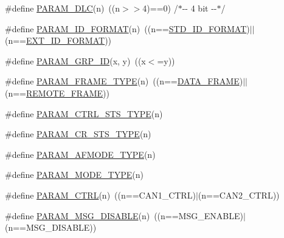 \begin{DoxyCompactItemize}
\item 
\#define \hyperlink{group___c_a_n___private___macros_ga361ef9af0ad2505b634d74179f63a685}{\-P\-A\-R\-A\-M\-\_\-\-D\-L\-C}(n)~((n$>$$>$4)==0)  /$\ast$-\/-\/ 4 bit -\/-\/$\ast$/
\item 
\#define \hyperlink{group___c_a_n___private___macros_ga61c9024337e9b7ef5df84b47d4118b0b}{\-P\-A\-R\-A\-M\-\_\-\-I\-D\-\_\-\-F\-O\-R\-M\-A\-T}(n)~((n==\hyperlink{group___c_a_n___public___types_ggab5c597672ab7b26c153bcaeda4828e37afa259432f5255caea8a3fabc42c61efe}{\-S\-T\-D\-\_\-\-I\-D\-\_\-\-F\-O\-R\-M\-A\-T})$|$$|$(n==\hyperlink{group___c_a_n___public___types_ggab5c597672ab7b26c153bcaeda4828e37a41ea63173c3b09052bc8882bb7a36d39}{\-E\-X\-T\-\_\-\-I\-D\-\_\-\-F\-O\-R\-M\-A\-T}))
\item 
\#define \hyperlink{group___c_a_n___private___macros_gab39ca8c3e693fe613812ab5b53741b27}{\-P\-A\-R\-A\-M\-\_\-\-G\-R\-P\-\_\-\-I\-D}(x, y)~((x$<$=y))
\item 
\#define \hyperlink{group___c_a_n___private___macros_ga12c12532f9443ad64c9fd405c80ab108}{\-P\-A\-R\-A\-M\-\_\-\-F\-R\-A\-M\-E\-\_\-\-T\-Y\-P\-E}(n)~((n==\hyperlink{group___c_a_n___public___types_gga8f522a08d7a773754ac6c4f54fae0711a4e9747725fb8de6f722482aeedfb8cbb}{\-D\-A\-T\-A\-\_\-\-F\-R\-A\-M\-E})$|$$|$(n==\hyperlink{group___c_a_n___public___types_gga8f522a08d7a773754ac6c4f54fae0711a2ff651f1e7a30143f1aaa0d2f26035fe}{\-R\-E\-M\-O\-T\-E\-\_\-\-F\-R\-A\-M\-E}))
\item 
\#define \hyperlink{group___c_a_n___private___macros_ga4d87b41dd34ec15241d11c5d9bba285b}{\-P\-A\-R\-A\-M\-\_\-\-C\-T\-R\-L\-\_\-\-S\-T\-S\-\_\-\-T\-Y\-P\-E}(n)
\item 
\#define \hyperlink{group___c_a_n___private___macros_gadbde9bbf583c4473069070509765401d}{\-P\-A\-R\-A\-M\-\_\-\-C\-R\-\_\-\-S\-T\-S\-\_\-\-T\-Y\-P\-E}(n)
\item 
\#define \hyperlink{group___c_a_n___private___macros_gae26c8f8309211ce4543247354295bbab}{\-P\-A\-R\-A\-M\-\_\-\-A\-F\-M\-O\-D\-E\-\_\-\-T\-Y\-P\-E}(n)
\item 
\#define \hyperlink{group___c_a_n___private___macros_ga829279ba1760839b35687ada6eb161d3}{\-P\-A\-R\-A\-M\-\_\-\-M\-O\-D\-E\-\_\-\-T\-Y\-P\-E}(n)
\item 
\#define \hyperlink{group___c_a_n___private___macros_ga3ce0609d1d4fbb09fd83d472fddfad69}{\-P\-A\-R\-A\-M\-\_\-\-C\-T\-R\-L}(n)~((n==\-C\-A\-N1\-\_\-\-C\-T\-R\-L)$|$(n==\-C\-A\-N2\-\_\-\-C\-T\-R\-L))
\item 
\#define \hyperlink{group___c_a_n___private___macros_gaa3559c77aa62709c2f2399f6bab18a84}{\-P\-A\-R\-A\-M\-\_\-\-M\-S\-G\-\_\-\-D\-I\-S\-A\-B\-L\-E}(n)~((n==\-M\-S\-G\-\_\-\-E\-N\-A\-B\-L\-E)$|$(n==\-M\-S\-G\-\_\-\-D\-I\-S\-A\-B\-L\-E))
$$
\end{DoxyCompactItemize}
